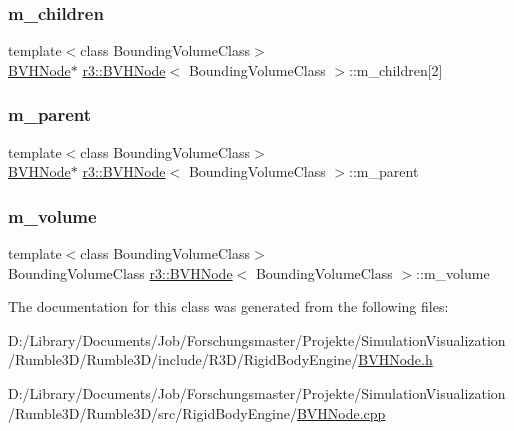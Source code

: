 \subsubsection{\texorpdfstring{m\+\_\+children}{m\_children}}
{\footnotesize\ttfamily template$<$class Bounding\+Volume\+Class$>$ \\
\mbox{\hyperlink{classr3_1_1_b_v_h_node}{B\+V\+H\+Node}}$\ast$ \mbox{\hyperlink{classr3_1_1_b_v_h_node}{r3\+::\+B\+V\+H\+Node}}$<$ Bounding\+Volume\+Class $>$\+::m\+\_\+children\mbox{[}2\mbox{]}\hspace{0.3cm}{\ttfamily [protected]}}

\mbox{\label{classr3_1_1_b_v_h_node_a62424473dd79cf59262a6a53995b0e26}} 
\subsubsection{\texorpdfstring{m\+\_\+parent}{m\_parent}}
{\footnotesize\ttfamily template$<$class Bounding\+Volume\+Class$>$ \\
\mbox{\hyperlink{classr3_1_1_b_v_h_node}{B\+V\+H\+Node}}$\ast$ \mbox{\hyperlink{classr3_1_1_b_v_h_node}{r3\+::\+B\+V\+H\+Node}}$<$ Bounding\+Volume\+Class $>$\+::m\+\_\+parent\hspace{0.3cm}{\ttfamily [protected]}}

\mbox{\label{classr3_1_1_b_v_h_node_a114366b1f5cbb56f6f650f9c794258a7}} 
\subsubsection{\texorpdfstring{m\+\_\+volume}{m\_volume}}
{\footnotesize\ttfamily template$<$class Bounding\+Volume\+Class$>$ \\
Bounding\+Volume\+Class \mbox{\hyperlink{classr3_1_1_b_v_h_node}{r3\+::\+B\+V\+H\+Node}}$<$ Bounding\+Volume\+Class $>$\+::m\+\_\+volume\hspace{0.3cm}{\ttfamily [protected]}}



The documentation for this class was generated from the following files\+:\begin{DoxyCompactItemize}
\item 
D\+:/\+Library/\+Documents/\+Job/\+Forschungsmaster/\+Projekte/\+Simulation\+Visualization/\+Rumble3\+D/\+Rumble3\+D/include/\+R3\+D/\+Rigid\+Body\+Engine/\mbox{\hyperlink{_b_v_h_node_8h}{B\+V\+H\+Node.\+h}}\item 
D\+:/\+Library/\+Documents/\+Job/\+Forschungsmaster/\+Projekte/\+Simulation\+Visualization/\+Rumble3\+D/\+Rumble3\+D/src/\+Rigid\+Body\+Engine/\mbox{\hyperlink{_b_v_h_node_8cpp}{B\+V\+H\+Node.\+cpp}}\end{DoxyCompactItemize}
